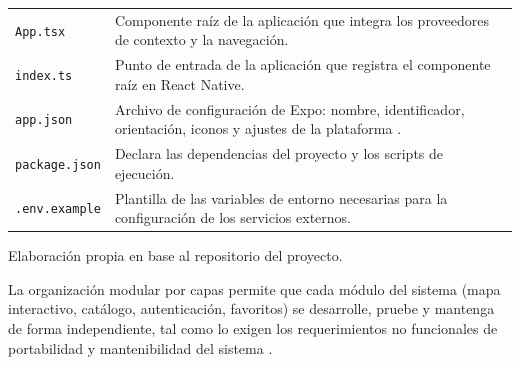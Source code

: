 \begin{table}[H]
{\begin{tablaAPA}
\begin{tabular}{@{}p{3.0cm}p{12.0cm}@{}}
        \addlinespace
        \texttt{App.tsx} &
        Componente ra\'iz de la aplicaci\'on que integra los proveedores de contexto
        y la navegaci\'on. \\
        \addlinespace
        \texttt{index.ts} &
        Punto de entrada de la aplicaci\'on que registra el componente ra\'iz en
        React Native. \\
        \addlinespace
        \texttt{app.json} &
        Archivo de configuraci\'on de Expo: nombre, identificador, orientaci\'on,
        iconos y ajustes de la plataforma \citep{expo}. \\
        \addlinespace
        \texttt{package.json} &
        Declara las dependencias del proyecto y los scripts de ejecuci\'on. \\
        \addlinespace
        \texttt{.env.example} &
        Plantilla de las variables de entorno necesarias para la configuraci\'on
        de los servicios externos. \\
        \bottomrule
      \end{tabular}
    \end{tablaAPA}%
  }{Elaboraci\'on propia en base al repositorio del proyecto.}
\end{table}

La organizaci\'on modular por capas permite que cada m\'odulo del sistema (mapa
interactivo, cat\'alogo, autenticaci\'on, favoritos) se desarrolle, pruebe y
mantenga de forma independiente, tal como lo exigen los requerimientos no
funcionales de portabilidad y mantenibilidad del sistema \citep{iso25010}.
